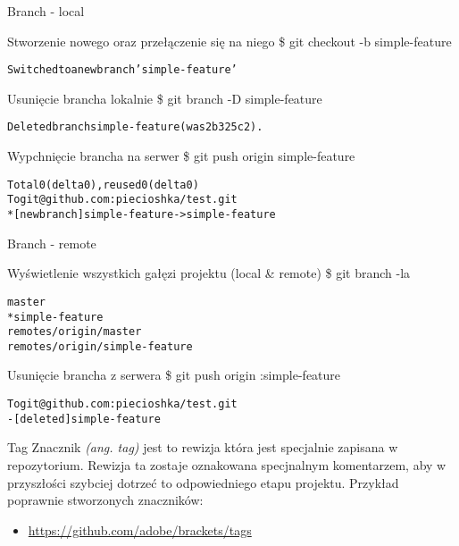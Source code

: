 \documentclass{beamer}
\begin{document}
\begin{frame}{Branch - local}
\begin{block}{Stworzenie nowego oraz przełączenie się na niego}
\$ git checkout -b simple-feature
\begin{alltt}
Switched to a new branch 'simple-feature'
\end{alltt}
\end{block}
\begin{block}{Usunięcie brancha lokalnie}
\$ git branch -D simple-feature
\begin{alltt}
Deleted branch simple-feature (was 2b325c2).
\end{alltt}
\end{block}
\begin{block}{Wypchnięcie brancha na serwer}
\$ git push origin simple-feature
\begin{alltt}
Total 0 (delta 0), reused 0 (delta 0) \\
To git@github.com:piecioshka/test.git \\
 * [new branch]      simple-feature -> simple-feature
\end{alltt}
\end{block}
\end{frame}

\begin{frame}{Branch - remote}
\begin{block}{Wyświetlenie wszystkich gałęzi projektu (local \& remote)}
\$ git branch -la
\begin{alltt}
  master \\
* simple-feature \\
  remotes/origin/master \\
  remotes/origin/simple-feature
\end{alltt}
\end{block}
\begin{block}{Usunięcie brancha z serwera}
\$ git push origin :simple-feature
\begin{alltt}
To git@github.com:piecioshka/test.git \\
 - [deleted]         simple-feature
\end{alltt}
\end{block}
\end{frame}

\begin{frame}{Tag}
Znacznik \textit{(ang. tag)} jest to rewizja która jest specjalnie zapisana w repozytorium.
Rewizja ta zostaje oznakowana specjnalnym komentarzem, aby w przyszłości szybciej dotrzeć to odpowiedniego etapu projektu.
\vskip 0.5cm
Przykład poprawnie stworzonych znaczników:
\begin{itemize}
  \item \url{https://github.com/adobe/brackets/tags}
\end{itemize}
\end{frame}
\end{document}

